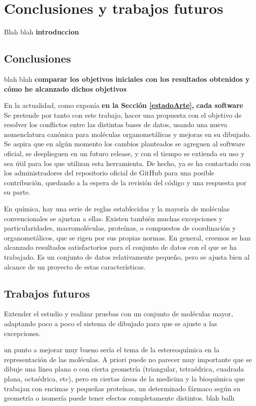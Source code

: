 \chapter{Conclusiones y trabajos futuros}

Blah blah \textbf{introduccion}

\section{Conclusiones}

blah blah \textbf{comparar los objetivos iniciales con los resultados obtenidos y cómo he alcanzado dichos objetivos}

En la actualidad, como exponía \textbf{en la Sección \ref{estadoArte}, } \textbf{cada software }
Se pretende por tanto con este trabajo, hacer una propuesta con el objetivo de resolver los conflictos entre las distintas bases de datos, usando una nueva nomenclatura canónica para moléculas organometálicas y mejoras en su dibujado.
Se aspira que en algún momento los cambios planteados se agreguen al software oficial, se desplieguen en un futuro release, y con el tiempo se extienda su uso y sea útil para los que utilizan esta herramienta. De hecho, ya se ha contactado con los administradores del repositorio oficial de GitHub para una posible contribución, quedando a la espera de la revisión del código y una respuesta por su parte.

En química, hay una serie de reglas establecidas y la mayoría de moléculas convencionales se ajustan a ellas. Existen también muchas excepciones y particularidades, macromoléculas, proteínas, o compuestos de coordinación y organometálicos, que se rigen por sus propias normas. En general, creemos se han alcanzado resultados satisfactorios para el conjunto de datos con el que se ha trabajado. Es un conjunto de datos relativamente pequeño, pero se ajusta bien al alcance de un proyecto de estas características. 



\section{Trabajos futuros}

Extender el estudio y realizar pruebas con un conjunto de moléculas mayor, adaptando poco a poco el sistema de dibujado para que se ajuste a las excepciones.

un punto a mejorar muy bueno sería el tema de la estereoquímica en la representación de las moléculas. A priori puede no parecer muy importante que se dibuje una línea plana o con cierta geometría (triangular, tetraédrica, cuadrada plana, octaédrica, etc), pero en ciertas áreas de la medicina y la bioquímica que trabajan con encimas y pequeñas proteínas, un determinado fármaco según su geometría o isomería puede tener efectos completamente distintos.
blah balh